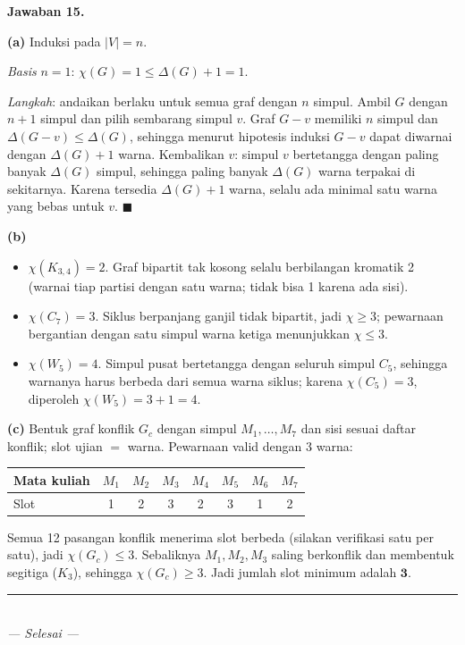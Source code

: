 \documentclass[11pt,a4paper]{article}
\newcommand{\jawab}[1]{\vspace{4pt}\noindent\textbf{Jawaban #1.}\par\nobreak\vspace{2pt}}
\begin{document}
\jawab{15}
\textbf{(a)} Induksi pada $|V| = n$.

\emph{Basis} $n = 1$: $\chi(G) = 1 \le \Delta(G) + 1 = 1$.

\emph{Langkah}: andaikan berlaku untuk semua graf dengan $n$ simpul. Ambil $G$
dengan $n+1$ simpul dan pilih sembarang simpul $v$. Graf $G - v$ memiliki $n$
simpul dan $\Delta(G-v) \le \Delta(G)$, sehingga menurut hipotesis induksi
$G - v$ dapat diwarnai dengan $\Delta(G) + 1$ warna. Kembalikan $v$: simpul $v$
bertetangga dengan paling banyak $\Delta(G)$ simpul, sehingga paling banyak
$\Delta(G)$ warna terpakai di sekitarnya. Karena tersedia $\Delta(G) + 1$ warna,
selalu ada minimal satu warna yang bebas untuk $v$. $\blacksquare$

\textbf{(b)}
\begin{itemize}[leftmargin=*,nosep]
  \item $\chi(K_{3,4}) = 2$. Graf bipartit tak kosong selalu berbilangan kromatik 2
        (warnai tiap partisi dengan satu warna; tidak bisa 1 karena ada sisi).
  \item $\chi(C_7) = 3$. Siklus berpanjang ganjil tidak bipartit, jadi $\chi \ge 3$;
        pewarnaan bergantian dengan satu simpul warna ketiga menunjukkan $\chi \le 3$.
  \item $\chi(W_5) = 4$. Simpul pusat bertetangga dengan seluruh simpul $C_5$,
        sehingga warnanya harus berbeda dari semua warna siklus; karena
        $\chi(C_5) = 3$, diperoleh $\chi(W_5) = 3 + 1 = 4$.
\end{itemize}

\textbf{(c)} Bentuk graf konflik $G_c$ dengan simpul $M_1,\dots,M_7$ dan sisi
sesuai daftar konflik; slot ujian $=$ warna. Pewarnaan valid dengan 3 warna:

\begin{center}
\begin{tabular}{lccccccc}
\toprule
Mata kuliah & $M_1$ & $M_2$ & $M_3$ & $M_4$ & $M_5$ & $M_6$ & $M_7$\\
\midrule
Slot & 1 & 2 & 3 & 2 & 3 & 1 & 2\\
\bottomrule
\end{tabular}
\end{center}

Semua 12 pasangan konflik menerima slot berbeda (silakan verifikasi satu per satu),
jadi $\chi(G_c) \le 3$. Sebaliknya $M_1, M_2, M_3$ saling berkonflik dan
membentuk segitiga ($K_3$), sehingga $\chi(G_c) \ge 3$. Jadi jumlah slot minimum
adalah $\mathbf{3}$.


\vspace{1cm}
\begin{center}
\rule{0.4\textwidth}{0.4pt}\\
\textit{--- Selesai ---}
\end{center}
\end{document}
